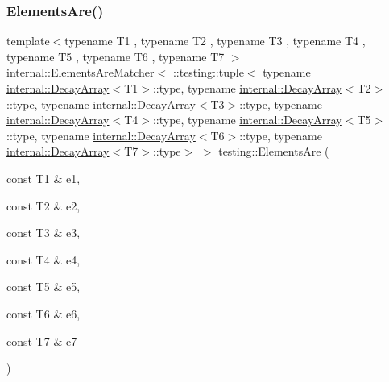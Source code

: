\subsubsection{\texorpdfstring{ElementsAre()}{ElementsAre()}\hspace{0.1cm}{\footnotesize\ttfamily [8/11]}}
{\footnotesize\ttfamily template$<$typename T1 , typename T2 , typename T3 , typename T4 , typename T5 , typename T6 , typename T7 $>$ \\
internal\+::\+Elements\+Are\+Matcher$<$ \+::testing\+::tuple$<$ typename \mbox{\hyperlink{structtesting_1_1internal_1_1_decay_array}{internal\+::\+Decay\+Array}}$<$T1$>$\+::type, typename \mbox{\hyperlink{structtesting_1_1internal_1_1_decay_array}{internal\+::\+Decay\+Array}}$<$T2$>$\+::type, typename \mbox{\hyperlink{structtesting_1_1internal_1_1_decay_array}{internal\+::\+Decay\+Array}}$<$T3$>$\+::type, typename \mbox{\hyperlink{structtesting_1_1internal_1_1_decay_array}{internal\+::\+Decay\+Array}}$<$T4$>$\+::type, typename \mbox{\hyperlink{structtesting_1_1internal_1_1_decay_array}{internal\+::\+Decay\+Array}}$<$T5$>$\+::type, typename \mbox{\hyperlink{structtesting_1_1internal_1_1_decay_array}{internal\+::\+Decay\+Array}}$<$T6$>$\+::type, typename \mbox{\hyperlink{structtesting_1_1internal_1_1_decay_array}{internal\+::\+Decay\+Array}}$<$T7$>$\+::type$>$ $>$ testing\+::\+Elements\+Are (\begin{DoxyParamCaption}\item[{const T1 \&}]{e1,  }\item[{const T2 \&}]{e2,  }\item[{const T3 \&}]{e3,  }\item[{const T4 \&}]{e4,  }\item[{const T5 \&}]{e5,  }\item[{const T6 \&}]{e6,  }\item[{const T7 \&}]{e7 }\end{DoxyParamCaption})\hspace{0.3cm}{\ttfamily [inline]}}

\mbox{\label{namespacetesting_a8d498031827c1d089dc84f5f14b7df12}} 
